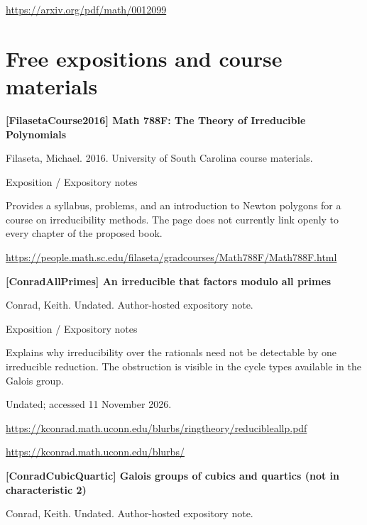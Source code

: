 \documentclass[11pt,a4paper,oneside,openany]{book}
\begin{document}
{\footnotesize\url{https://arxiv.org/pdf/math/0012099}}\par
\vspace{9pt}
\section{Free expositions and course materials}
\hypertarget{ref:FilasetaCourse2016}{}
{\sffamily\bfseries\color{atlasgreen}[FilasetaCourse2016] Math 788F: The Theory of Irreducible Polynomials}\par
\color{black} Filaseta, Michael. 2016. University of South Carolina course materials.\par
{\small\sffamily\color{atlasgold}Exposition / Expository notes}\par
\color{black} Provides a syllabus, problems, and an introduction to Newton polygons for a course on irreducibility methods. The page does not currently link openly to every chapter of the proposed book.\par
{\footnotesize\url{https://people.math.sc.edu/filaseta/gradcourses/Math788F/Math788F.html}}\par
\vspace{9pt}
\hypertarget{ref:ConradAllPrimes}{}
{\sffamily\bfseries\color{atlasgreen}[ConradAllPrimes] An irreducible that factors modulo all primes}\par
\color{black} Conrad, Keith. Undated. Author-hosted expository note.\par
{\small\sffamily\color{atlasgold}Exposition / Expository notes}\par
\color{black} Explains why irreducibility over the rationals need not be detectable by one irreducible reduction. The obstruction is visible in the cycle types available in the Galois group.\par
{\small Undated; accessed 11 November 2026.}\par
{\footnotesize\url{https://kconrad.math.uconn.edu/blurbs/ringtheory/reducibleallp.pdf}}\par
{\footnotesize\url{https://kconrad.math.uconn.edu/blurbs/}}\par
\vspace{9pt}
\hypertarget{ref:ConradCubicQuartic}{}
{\sffamily\bfseries\color{atlasgreen}[ConradCubicQuartic] Galois groups of cubics and quartics (not in characteristic 2)}\par
\color{black} Conrad, Keith. Undated. Author-hosted expository note.\par
\end{document}
